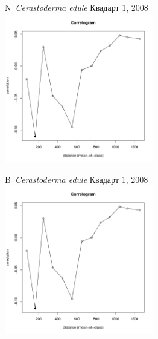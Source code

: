 \begin{figure}[h]
	
	\begin{minipage}[b]{.46\linewidth}
	\begin{center}
	{\small N~{\it Cerastoderma edule} Квадарт 1, 2008}
		\includegraphics[width=65mm]{../Barenc_Sea/distribution_Moran/Plyazh081_moran_B_Cerastoderma_edule_.pdf}

	\end{center}
	\end{minipage}
	\hfil %
	\begin{minipage}[b]{.46\linewidth}
	\begin{center}
	{\small B~{\it Cerastoderma edule} Квадарт 1, 2008}
		\includegraphics[width=65mm]{../Barenc_Sea/distribution_Moran/Plyazh081_moran_B_Cerastoderma_edule_.pdf}
	\end{center}
	\end{minipage}


\end{figure}
